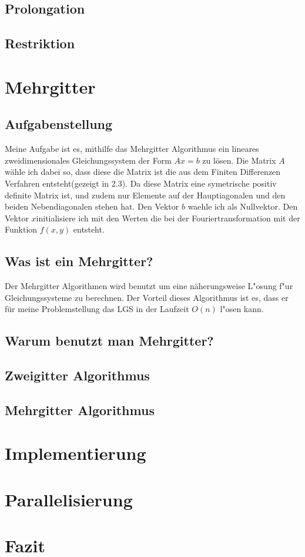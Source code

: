 \documentclass[a4paper, 11pt]{article}
\begin{document}
            \subsection{Prolongation}
            \subsection{Restriktion}
    \section{Mehrgitter}
    	\subsection{Aufgabenstellung}
    	Meine Aufgabe ist es, mithilfe das Mehrgitter Algorithmus ein lineares zweidimensionales Gleichungssystem der Form $Ax=b$ zu l\"{o}sen. Die Matrix $A$ w\"{a}hle ich dabei so, dass diese die Matrix ist die aus dem Finiten Differenzen Verfahren entsteht(gezeigt in 2.3). Da diese Matrix eine symetrische positiv definite Matrix ist, und zudem nur Elemente auf der Hauptiagonalen und den beiden Nebendiagonalen stehen hat. Den Vektor $b$ waehle ich als Nullvektor. Den Vektor $x$initialisiere ich mit den Werten die bei der Fouriertransformation mit der Funktion $ f(x,y)$ entsteht.
        \subsection{Was ist ein Mehrgitter?}
        Der Mehrgitter Algorithmen wird benutzt um eine n\"{a}herungsweise L"{o}sung f"{u}r Gleichungssysteme zu berechnen. Der Vorteil dieses Algorithmus ist es, dass er f\"{u}r meine Problemstellung das LGS in der Laufzeit $O(n)$ l"{o}sen kann.
        \subsection{Warum benutzt man Mehrgitter?}
        \subsection{Zweigitter Algorithmus}
        \subsection{Mehrgitter Algorithmus}
    \section{Implementierung}
    \section{Parallelisierung}
    \section{Fazit}
\end{document}
